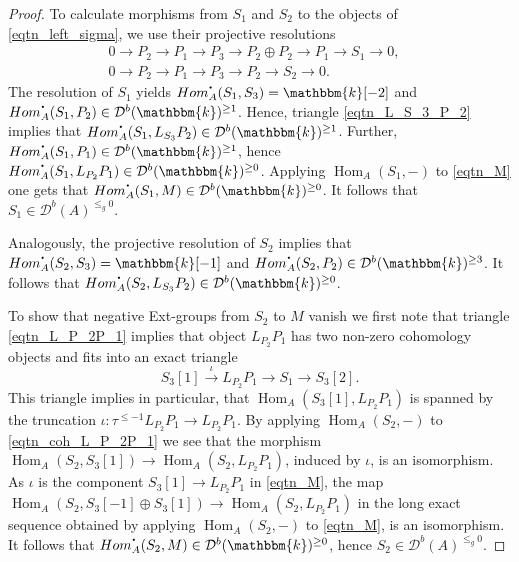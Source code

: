 \documentclass[10pt,a4paper]{amsart}
\newcommand{\Hom}{\mathop{\textrm{Hom}}\nolimits}
\newcommand{\bcdot}{{\mbox{\boldmath{$\cdot$}}}}
\newcommand{\dD}{{\mathcal{D}}}
\newcommand{\kk}{\mathbbm{k}}
\begin{document}
\begin{proof}
To calculate morphisms from $S_1$ and $S_2$ to the objects of \eqref{eqtn_left_sigma}, we use their projective resolutions
\begin{align*}
	0 \to P_2 \to P_1 \to P_3\to P_2 \oplus P_2 \to P_1 \to S_1 \to 0,&\\
	0 \to P_2 \to P_1 \to P_3 \to P_2 \to S_2 \to 0.&
\end{align*}
 The resolution of $S_1$ yields $\Hom_A^{\bcdot}(S_1, S_3 )=\kk[-2]$ and $\Hom_A^{\bcdot}(S_1, P_2) \in \dD^b(\kk)^{\geq 1}$. Hence, triangle \eqref{eqtn_L_S_3_P_2} implies that $\Hom_A^{\bcdot}(S_1, L_{S_3}P_2) \in \dD^b(\kk)^{\geq 1}$. Further, $\Hom_{A}^{\bcdot}(S_1, P_1)\in \dD^b(\kk)^{\geq 1}$, hence $\Hom_A^{\bcdot}(S_1, L_{P_2}P_1) \in \dD^b(\kk)^{\geq 0}$. Applying $\Hom_A(S_1,-)$ to \eqref{eqtn_M} one gets that $\Hom_A^{\bcdot}(S_1,M) \in \dD^b(\kk)^{\geq 0}$. It follows that $S_1\in \dD^b(A)^{\leq_g 0}$.
 
 Analogously, the projective resolution of $S_2$ implies that $\Hom_A^{\bcdot}(S_2,S_3) = \kk[-1]$ and $\Hom_A^{\bcdot}(S_2,P_2) \in \dD^b(\kk)^{\geq 3}$. It follows that $\Hom_A^{\bcdot}(S_2, L_{S_3}P_2) \in \dD^b(\kk)^{\geq 0}$.
 
 To show that negative Ext-groups from $S_2$ to $M$ vanish we first note that triangle \eqref{eqtn_L_P_2P_1} implies that object $L_{P_2}P_1$ has two non-zero cohomology objects and fits into an exact triangle
 \begin{equation}\label{eqtn_coh_L_P_2P_1}
 	S_3[1] \xrightarrow{\iota} L_{P_2}P_1 \to S_1 \to S_3[2].
 \end{equation}
This triangle implies in particular, that $\Hom_A(S_3[1], L_{P_2}P_1)$ is spanned by the truncation $\iota \colon \tau^{\leq -1}L_{P_2}P_1\to L_{P_2}P_1$. By applying $\Hom_A(S_2, -)$ to \eqref{eqtn_coh_L_P_2P_1} we see that the morphism $\Hom_A(S_2, S_3[1]) \to \Hom_A(S_2, L_{P_2}P_1)$, induced by $\iota$, is an isomorphism. As $\iota$ is the component $S_3[1] \to L_{P_2}P_1$ in \eqref{eqtn_M}, the map $\Hom_A(S_2, S_3[-1] \oplus S_3[1]) \to \Hom_A(S_2, L_{P_2}P_1)$ in the long exact sequence obtained by applying $\Hom_A(S_2, -)$ to \eqref{eqtn_M}, is an isomorphism. It follows that $\Hom_A^{\bcdot}(S_2, M) \in \dD^b(\kk) ^{\geq 0}$, hence $S_2 \in \dD^b(A)^{\leq_g 0}$. 
\end{proof}
\end{document}
